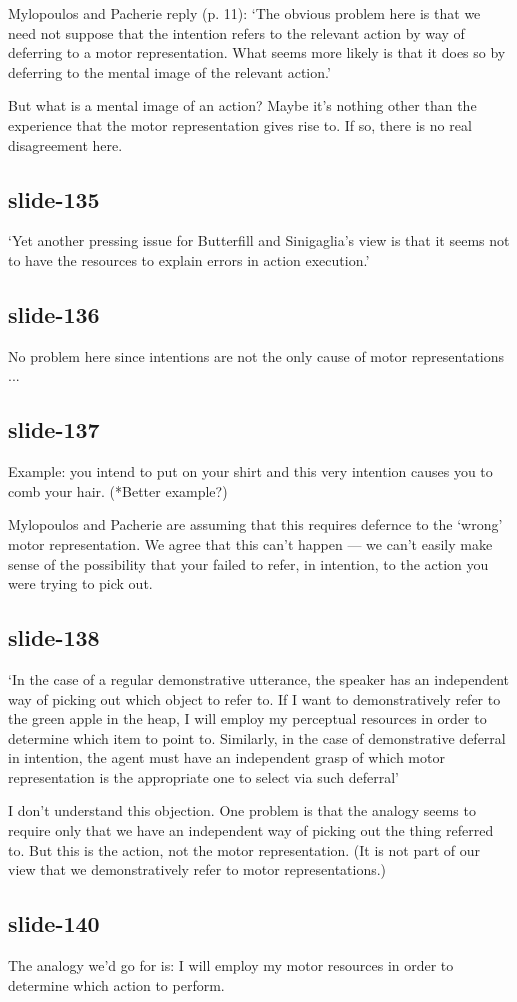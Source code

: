 \documentclass[12pt,\papersize]{extarticle}
\begin{document}
Mylopoulos and Pacherie reply (p. 11): ‘The obvious problem here is that we need not
suppose that the intention refers to the relevant action by way of deferring to a motor
representation. What seems more likely is that it does so by deferring to the mental image
of the relevant action.’

But what is a mental image of an action? Maybe it’s nothing other than the
experience that the motor representation gives rise to.  If so, there is no
real disagreement here.

\subsection{slide-135}
‘Yet another pressing issue for Butterfill and Sinigaglia’s view is that it seems not to
have the resources to explain errors in action execution.’

\subsection{slide-136}
No problem here since intentions are not the only cause of motor representations ...

\subsection{slide-137}
Example: you intend to put on your shirt and this very intention causes you
to comb your hair.  (*Better example?)

Mylopoulos and Pacherie are assuming that this requires defernce to the
‘wrong’ motor representation.
We agree that this can’t happen --- we can’t easily make sense of the possibility that
your failed to refer, in intention, to the action you were trying to pick out.

\subsection{slide-138}
‘In the case of a regular demonstrative utterance, the speaker has an independent way of picking out which object to refer to. If I want to demonstratively refer to the green apple in the heap, I will employ my perceptual resources in order to determine which item to point to. Similarly, in the case of demonstrative deferral in intention, the agent must have an independent grasp of which motor representation is the appropriate one to select via such deferral’

I don’t understand this objection.  One problem is that the analogy seems to require
only that we have an independent way of picking out the thing referred to.
But this is the action, not the motor representation.
(It is not part of our view that we demonstratively refer to motor representations.)

\subsection{slide-140}
The analogy we’d go for is: I will employ my motor resources in order to determine
which action to perform.











\end{document}

